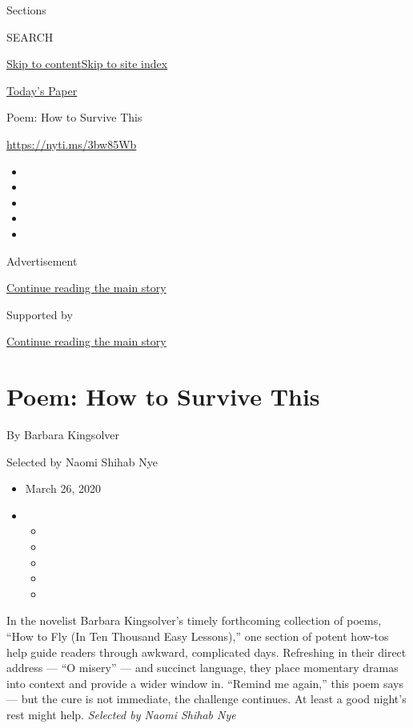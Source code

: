 Sections

SEARCH

\protect\hyperlink{site-content}{Skip to
content}\protect\hyperlink{site-index}{Skip to site index}

\href{https://myaccount.nytimes3xbfgragh.onion/auth/login?response_type=cookie\&client_id=vi}{}

\href{https://www.nytimes3xbfgragh.onion/section/todayspaper}{Today's
Paper}

Poem: How to Survive This

\url{https://nyti.ms/3bw85Wb}

\begin{itemize}
\item
\item
\item
\item
\item
\end{itemize}

Advertisement

\protect\hyperlink{after-top}{Continue reading the main story}

Supported by

\protect\hyperlink{after-sponsor}{Continue reading the main story}

\hypertarget{poem-how-to-survive-this}{%
\section{Poem: How to Survive This}\label{poem-how-to-survive-this}}

By Barbara Kingsolver

Selected by Naomi Shihab Nye

\begin{itemize}
\item
  March 26, 2020
\item
  \begin{itemize}
  \item
  \item
  \item
  \item
  \item
  \end{itemize}
\end{itemize}

In the novelist Barbara Kingsolver's timely forthcoming collection of
poems, ``How to Fly (In Ten Thousand Easy Lessons),'' one section of
potent how-tos help guide readers through awkward, complicated days.
Refreshing in their direct address --- ``O misery'' --- and succinct
language, they place momentary dramas into context and provide a wider
window in. ``Remind me again,'' this poem says --- but the cure is not
immediate, the challenge continues. At least a good night's rest might
help. \emph{Selected by Naomi Shihab Nye}

